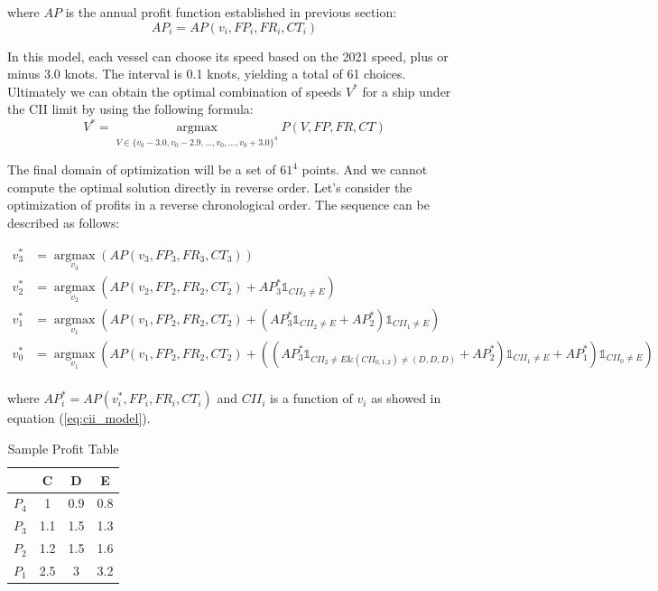 \documentclass[a4paper,12pt]{article}
\begin{document}
where $AP$ is the annual profit function established in previous section:
\begin{equation}
	AP_i = AP(v_i, FP_i, FR_i, CT_i)
\end{equation}

In this model, each vessel can choose its speed based on the 2021 speed, plus or minus 3.0 knots.
The interval is 0.1 knots, yielding a total of 61 choices.
Ultimately we can obtain the optimal combination of speeds $V^\ast$ for a ship under the CII limit by using the following formula:
\begin{equation}
	\label{eq:vast}
	V^\ast = \operatorname*{argmax}_{V\in \{v_0-3.0, v_0-2.9, ..., v_0,...,v_0+3.0 \}^4} P(V, FP, FR, CT)
\end{equation}


The final domain of optimization will be a set of $61^4$ points.
And we cannot compute the optimal solution directly in reverse order.
Let's consider the optimization of profits in a reverse chronological order.
The sequence can be described as follows:

\begin{align*}
	v_3^\ast & = \operatorname*{argmax}_{v_3} (AP(v_3, FP_3, FR_3, CT_3))                                                                                                                                                    \\
	v_2^\ast & = \operatorname*{argmax}_{v_2}  (AP(v_2, FP_2, FR_2, CT_2)+AP_3^\ast \mathds{1} _{CII_2 \neq E} )                                                                                                             \\
	v_1^\ast & = \operatorname*{argmax}_{v_1}  (AP(v_1, FP_2, FR_2, CT_2)+(AP_3^\ast \mathds{1} _{CII_2 \neq E}+ AP_2^\ast )\mathds{1} _{CII_1 \neq E} )                                                                     \\
	v_0^\ast & = \operatorname*{argmax}_{v_1}  (AP(v_1, FP_2, FR_2, CT_2)+((AP_3^\ast \mathds{1} _{CII_2 \neq E \& (CII_{0,1,2}) \neq (D,D,D)}+ AP_2^\ast)\mathds{1} _{CII_1 \neq E} +AP_1^\ast )\mathds{1} _{CII_0 \neq E}) \\
\end{align*}

where $AP_i^\ast = AP(v_i^\ast, FP_i, FR_i, CT_i)$ and $CII_i$ is a function of $v_i$ as showed in equation (\ref{eq:cii_model}).\\

\begin{table}[h!]
	\centering
	\begin{tabular}{|c|c|c|c|}
		\hline
		      & C   & D   & E   \\
		\hline
		$P_4$ & 1   & 0.9 & 0.8 \\
		\hline
		$P_3$ & 1.1 & 1.5 & 1.3 \\
		\hline
		$P_2$ & 1.2 & 1.5 & 1.6 \\
		\hline
		$P_1$ & 2.5 & 3   & 3.2 \\
		\hline
	\end{tabular}
	\caption{Sample Profit Table}
	\label{tb:sample_profit}
\end{table}
\end{document}
